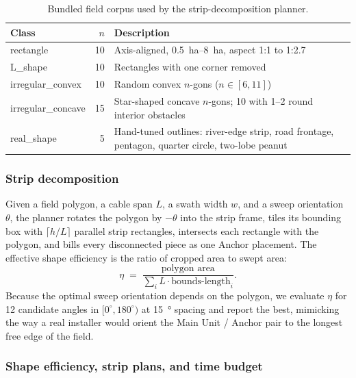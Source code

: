 \documentclass[11pt,a4paper]{article}
\begin{document}
\begin{table}[H]
\centering\small
\caption{Bundled field corpus used by the strip-decomposition planner.}\label{tab:corpus}
\begin{tabularx}{\textwidth}{lrX}
\toprule
Class & $n$ & Description \\
\midrule
rectangle           & 10 & Axis-aligned, \SIrange{0.5}{8}{\hectare}, aspect 1:1 to 1:2.7 \\
L\_shape            & 10 & Rectangles with one corner removed \\
irregular\_convex   & 10 & Random convex $n$-gons ($n \in [6,11]$) \\
irregular\_concave  & 15 & Star-shaped concave $n$-gons; 10 with 1--2 round interior obstacles \\
real\_shape         & 5  & Hand-tuned outlines: river-edge strip, road frontage, pentagon, quarter circle, two-lobe peanut \\
\bottomrule
\end{tabularx}
\end{table}

\subsubsection{Strip decomposition}\label{sec:strip}

Given a field polygon, a cable span $L$, a swath width $w$, and a sweep orientation $\theta$, the planner rotates the polygon by $-\theta$ into the strip frame, tiles its bounding box with $\lceil h/L \rceil$ parallel strip rectangles, intersects each rectangle with the polygon, and bills every disconnected piece as one Anchor placement. The effective shape efficiency is the ratio of cropped area to swept area:
\begin{equation}\label{eq:eta-shape}
\eta \;=\; \frac{\text{polygon area}}{\sum_{i} L \cdot \text{bounds-length}_{i}}.
\end{equation}
Because the optimal sweep orientation depends on the polygon, we evaluate $\eta$ for 12 candidate angles in $[0^{\circ}, 180^{\circ})$ at \SI{15}{\degree} spacing and report the best, mimicking the way a real installer would orient the Main Unit / Anchor pair to the longest free edge of the field.

\subsubsection{Shape efficiency, strip plans, and time budget}\label{sec:f9-f11}
\end{document}
